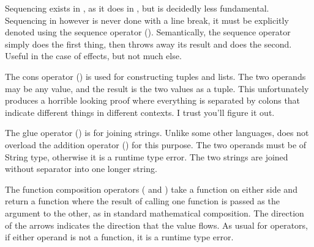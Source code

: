 Sequencing exists in \Poetry{}, as it does in \Prose{}, but is decidedly less
fundamental. Sequencing in \Poetry{} however is never done with a line break,
it must be explicitly denoted using the sequence operator (\op{,}). Semantically,
the sequence operator simply does the first thing, then throws away its result
and does the second. Useful in the case of effects, but not much else.

\begin{prooftree}
\end{prooftree}

The cons operator (\op{:}) is used for constructing tuples and lists. The
two operands may be any value, and the result is the two values as a tuple.
This unfortunately produces a horrible looking proof where everything is
separated by colons that indicate different things in different contexts.
I trust you'll figure it out.

\begin{prooftree}
\end{prooftree}

The glue operator (\op{<>}) is for joining strings. Unlike some other languages,
\Trilogy{} does not overload the addition operator (\op{+}) for this purpose.
The two operands must be of String type, otherwise it is a runtime type error.
The two strings are joined without separator into one longer string.

\begin{prooftree}
\end{prooftree}

The function composition operators (\op{<<} and \op{>>}) take a function on either
side and return a function where the result of calling one function is passed as the
argument to the other, as in standard mathematical composition. The direction of
the arrows indicates the direction that the value flows. As usual for operators,
if either operand is not a function, it is a runtime type error.

\begin{prooftree}
\end{prooftree}

